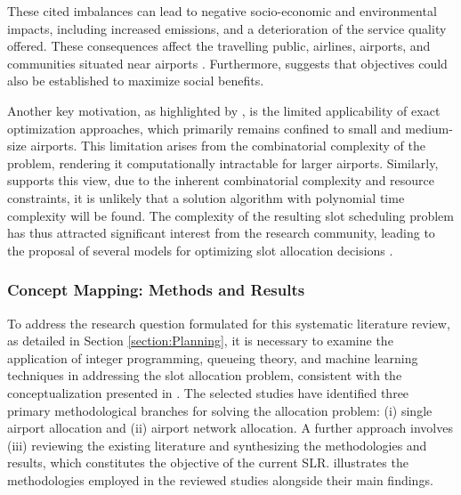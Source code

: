 These cited imbalances can lead to negative socio-economic and environmental
impacts, including increased emissions, and a deterioration of the service
quality offered. These consequences affect the travelling public, airlines,
airports, and communities situated near airports \cite{keskin_optimal_2023}.
Furthermore,  suggests that objectives could
also be established to maximize social benefits.



Another key motivation, as highlighted by ,
is the limited applicability of exact optimization approaches, which primarily
remains confined to small and medium-size airports.
%
This limitation arises from the combinatorial complexity of the problem,
rendering it computationally intractable for larger airports.
%
Similarly,  supports this view, due to the
inherent combinatorial complexity and resource constraints, it is unlikely that
a solution algorithm with polynomial time complexity will be found.
%
The complexity of the resulting slot scheduling problem has thus attracted
significant interest from the research community, leading to the proposal of
several models for optimizing slot allocation decisions
\cite{jiang_decision_2021}.



\subsubsection{Concept Mapping: Methods and Results}

To address the research question formulated for this systematic literature
review, as detailed in Section \ref{section:Planning}, it is necessary to
examine the application of integer programming, queueing theory, and machine
learning techniques in addressing the slot allocation problem, consistent with
the conceptualization presented in .
%
The selected studies have identified three primary methodological branches for
solving the allocation problem: (i) single airport allocation and (ii) airport
network allocation.
%
A further approach involves (iii) reviewing the existing literature and
synthesizing the methodologies and results, which constitutes the objective of
the current \acrfull{SLR}.
%
 illustrates the methodologies employed in the
reviewed studies alongside their main findings.



